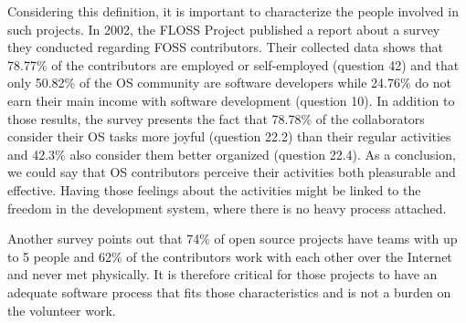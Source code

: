 Considering this definition, it is important to characterize the
people involved in such projects. In 2002, the FLOSS Project
\cite{FlossProject} published a report about a survey they conducted
regarding FOSS contributors. Their collected data \cite{FlossStats}
shows that 78.77\% of the contributors are employed or self-employed
(question 42) and that only 50.82\% of the OS community are software
developers while 24.76\% do not earn their main income with software
development (question 10).  In addition to those results, the survey
presents the fact that 78.78\% of the collaborators consider their OS
tasks more joyful (question 22.2) than their regular activities and
42.3\% also consider them better organized (question 22.4). As a
conclusion, we could say that OS contributors perceive their
activities both pleasurable and effective. Having those feelings about
the activities might be linked to the freedom in the development
system, where there is no heavy process attached.

Another survey \cite{Reis2003} points out that 74\% of open source
projects have teams with up to 5 people and 62\% of the contributors
work with each other over the Internet and never met physically.  It
is therefore critical for those projects to have an adequate software
process that fits those characteristics and is not a burden on the
volunteer work.